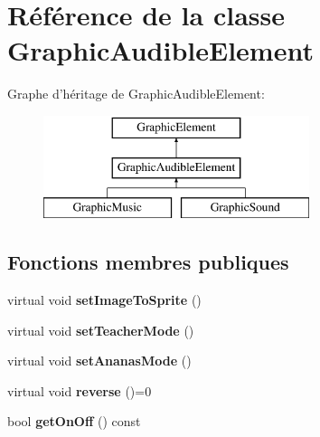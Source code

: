 \hypertarget{class_graphic_audible_element}{\section{Référence de la classe Graphic\-Audible\-Element}
\label{class_graphic_audible_element}
}
Graphe d'héritage de Graphic\-Audible\-Element\-:\begin{figure}[H]
\begin{center}
\leavevmode
\includegraphics[height=3.000000cm]{class_graphic_audible_element}
\end{center}
\end{figure}
\subsection*{Fonctions membres publiques}
\begin{DoxyCompactItemize}
\item 
\hypertarget{class_graphic_audible_element_a77fd0f4aa0bf4e9297a790a1e920a00d}{virtual void {\bfseries set\-Image\-To\-Sprite} ()}\label{class_graphic_audible_element_a77fd0f4aa0bf4e9297a790a1e920a00d}

\item 
\hypertarget{class_graphic_audible_element_a0c740dab12b2f82088fa3e9ef700b97d}{virtual void {\bfseries set\-Teacher\-Mode} ()}\label{class_graphic_audible_element_a0c740dab12b2f82088fa3e9ef700b97d}

\item 
\hypertarget{class_graphic_audible_element_a02916f15862524394c0ab8af1aed1b26}{virtual void {\bfseries set\-Ananas\-Mode} ()}\label{class_graphic_audible_element_a02916f15862524394c0ab8af1aed1b26}

\item 
\hypertarget{class_graphic_audible_element_a26b22e8494b6bc40258692b8d79b33ba}{virtual void {\bfseries reverse} ()=0}\label{class_graphic_audible_element_a26b22e8494b6bc40258692b8d79b33ba}

\item 
\hypertarget{class_graphic_audible_element_a6ea54ae9948bed795527b42e3bbfc69a}{bool {\bfseries get\-On\-Off} () const }\label{class_graphic_audible_element_a6ea54ae9948bed795527b42e3bbfc69a}

\end{DoxyCompactItemize}
